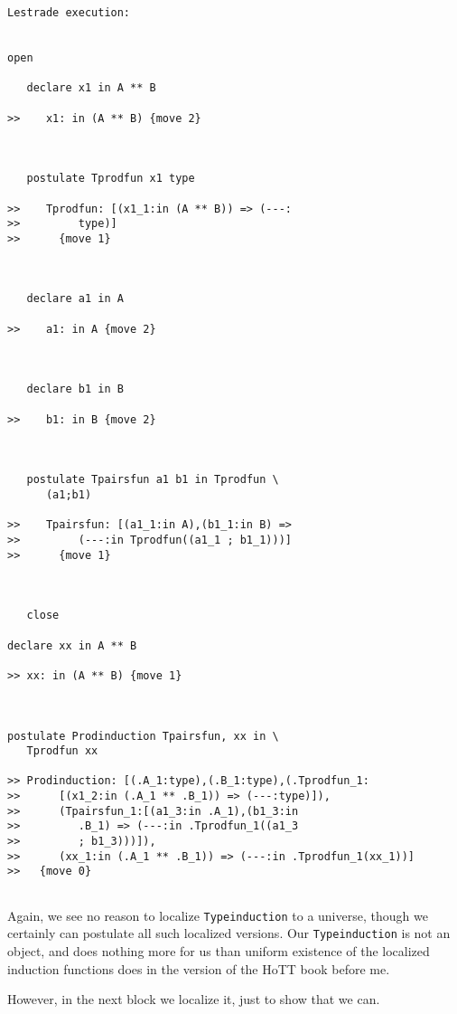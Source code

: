 \documentclass{article}
\begin{document}
\begin{verbatim}Lestrade execution:


open

   declare x1 in A ** B

>>    x1: in (A ** B) {move 2}



   postulate Tprodfun x1 type

>>    Tprodfun: [(x1_1:in (A ** B)) => (---:
>>         type)]
>>      {move 1}



   declare a1 in A

>>    a1: in A {move 2}



   declare b1 in B

>>    b1: in B {move 2}



   postulate Tpairsfun a1 b1 in Tprodfun \
      (a1;b1)

>>    Tpairsfun: [(a1_1:in A),(b1_1:in B) =>
>>         (---:in Tprodfun((a1_1 ; b1_1)))]
>>      {move 1}



   close

declare xx in A ** B

>> xx: in (A ** B) {move 1}



postulate Prodinduction Tpairsfun, xx in \
   Tprodfun xx

>> Prodinduction: [(.A_1:type),(.B_1:type),(.Tprodfun_1:
>>      [(x1_2:in (.A_1 ** .B_1)) => (---:type)]),
>>      (Tpairsfun_1:[(a1_3:in .A_1),(b1_3:in
>>         .B_1) => (---:in .Tprodfun_1((a1_3
>>         ; b1_3)))]),
>>      (xx_1:in (.A_1 ** .B_1)) => (---:in .Tprodfun_1(xx_1))]
>>   {move 0}


\end{verbatim}

Again, we see no reason to localize {\tt Typeinduction} to a universe, though we certainly can postulate all such localized versions.  Our {\tt Typeinduction}
is not an object, and does nothing more for us than uniform existence of the localized induction functions does in the version of the HoTT book before me.

However, in the next block we localize it, just to show that we can.
\end{document}
